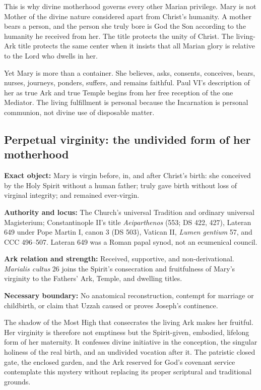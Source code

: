 This is why divine motherhood governs every other Marian privilege.  Mary is
not Mother of the divine nature considered apart from Christ's humanity.  A
mother bears a person, and the person she truly bore is God the Son according
to the humanity he received from her.  The title protects the unity of Christ.
The living-Ark title protects the same center when it insists that all Marian
glory is relative to the Lord who dwells in her.

Yet Mary is more than a container.  She believes, asks, consents, conceives,
bears, nurses, journeys, ponders, suffers, and remains faithful.  Paul VI's
description of her as true Ark and true Temple begins from her free reception
of the one Mediator.  The living fulfillment is personal because the
Incarnation is personal communion, not divine use of disposable matter.

\subsection{Perpetual virginity: the undivided form of her motherhood}

\begin{studyframe}
\textbf{Exact object:} Mary is virgin before, in, and after Christ's birth:
she conceived by the Holy Spirit without a human father; truly gave birth
without loss of virginal integrity; and remained ever-virgin.\par
\textbf{Authority and locus:} The Church's universal Tradition and ordinary
universal Magisterium; Constantinople II's title \emph{Aeiparthenos} (553;
DS 422, 427), Lateran 649 under Pope Martin I, canon 3 (DS 503), Vatican II,
\emph{Lumen gentium} 57, and CCC 496--507.  Lateran 649 was a Roman papal
synod, not an ecumenical council.\par
\textbf{Ark relation and strength:} Received, supportive, and
non-derivational.  \emph{Marialis cultus} 26 joins the Spirit's consecration
and fruitfulness of Mary's virginity to the Fathers' Ark, Temple, and dwelling
titles.\par
\textbf{Necessary boundary:} No anatomical reconstruction, contempt for
marriage or childbirth, or claim that Uzzah caused or proves Joseph's
continence.
\end{studyframe}

The shadow of the Most High that consecrates the living Ark makes her
fruitful.  Her virginity is therefore not emptiness but the Spirit-given,
embodied, lifelong form of her maternity.  It confesses divine initiative in
the conception, the singular holiness of the real birth, and an undivided
vocation after it.  The patristic closed gate, the enclosed garden, and the Ark
reserved for God's covenant service contemplate this mystery without
replacing its proper scriptural and traditional grounds.

